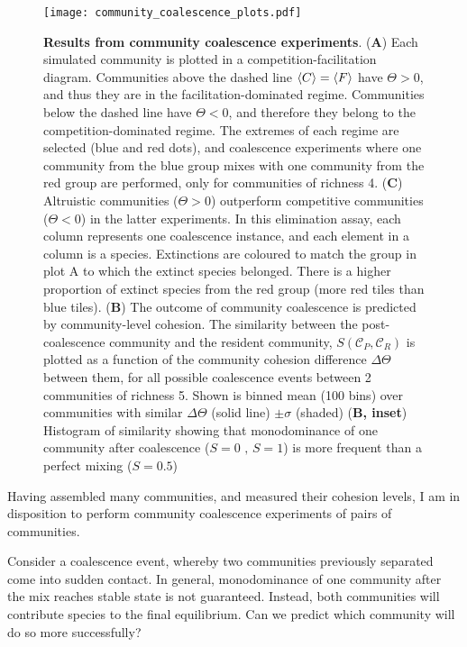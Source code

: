 \documentclass[titlepage,11pt]{article}
\begin{document}
\begin{linenumbers}
			\begin{figure}
				\centering			
				\texttt{[image: community\_coalescence\_plots.pdf]}
				\caption{\textbf{Results from community coalescence experiments}. (\textbf{A}) Each simulated community is plotted in a competition-facilitation diagram. Communities above the dashed line $ \braket{C} = \braket{F} $ have $ \Theta > 0 $, and thus they are in the facilitation-dominated regime. Communities below the dashed line have $ \Theta <0 $, and therefore they belong to the competition-dominated regime. The extremes of each regime are selected (blue and red dots), and coalescence experiments where one community from the blue group mixes with one community from the red group are performed, only for communities of richness 4. (\textbf{C}) Altruistic communities ($ \Theta > 0 $) outperform competitive communities ($ \Theta < 0 $) in the latter experiments. In this elimination assay, each column represents one coalescence instance, and each element in a column is a species. Extinctions are coloured to match the group in plot A to which the extinct species belonged. There is a higher proportion of extinct species from the red group (more red tiles than blue tiles). (\textbf{B}) The outcome of community coalescence is predicted by community-level cohesion.  The similarity between the post-coalescence community and the resident community, $ S (\mathcal{C}_P, \mathcal{C}_R) $ is plotted as a function of the community cohesion difference $ \Delta \Theta $ between them, for all possible coalescence events between 2 communities of richness 5. Shown is binned mean (100 bins) over communities with similar $ \Delta \Theta $ (solid line) $ \pm \sigma $ (shaded) (\textbf{B, inset}) Histogram of similarity showing that monodominance of one community after coalescence  ($ S = 0 \text{ , } S = 1 $) is more frequent than a perfect mixing ($ S = 0.5 $)}
				\label{fig:community_coalescence_results}
			\end{figure}
			Having assembled many communities, and measured their cohesion levels, I am in disposition to perform community coalescence experiments of pairs of communities.\par
			Consider a coalescence event, whereby two communities previously separated come into sudden contact. In general, monodominance of one community after the mix reaches stable state is not guaranteed. Instead, both communities will contribute species to the final equilibrium. Can we predict which community will do so more successfully?\par

\end{linenumbers}
\end{document}
